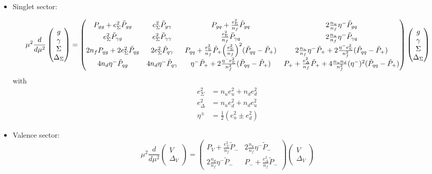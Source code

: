 \documentclass[a4paper,twoside]{article}
\title{}
\author{}
\date{}
\begin{document}
\maketitle
\begin{itemize}
\item Singlet sector:

\begin{equation*}
\mu^2\frac{d}{d\mu^2}
\begin{pmatrix}
g \\
\gamma \\
\Sigma \\
\Delta_\Sigma
\end{pmatrix}
=
\begin{pmatrix}
 P_{gg}+e_\Sigma^2 \tilde{P}_{gg} & e_\Sigma^2 \tilde{P}_{g\gamma} & P_{gq} + \frac{e_\Sigma^2}{n_f}\tilde{P}_{gq} & 2\frac{n_u}{n_f}\eta^- \tilde{P}_{gq} \\
 e_\Sigma^2 \tilde{P}_{\gamma g} & e_\Sigma^2 \tilde{P}_{\gamma \gamma} & \frac{e_\Sigma^2}{n_f}\tilde{P}_{\gamma q} & 2\frac{n_u}{n_f}\eta^- \tilde{P}_{\gamma q} \\
 2n_f P_{qg} +2e_\Sigma^2  \tilde{P}_{qg} & 2 e_\Sigma^2  \tilde{P}_{q\gamma} & P_{qq}+ \frac{e_\Sigma^2}{n_f}\tilde{P}_{+}  \Bigl(\frac{e_\Sigma^2}{n_f}\Bigr)^2(\tilde{P}_{qq}-\tilde{P}_{+}) & 2\frac{n_u}{n_f}\eta^-\tilde{P}_{+}+2\frac{\eta^-e_\Sigma^2}{n_f^2}(\tilde{P}_{qq}-\tilde{P}_{+}) \\
 4n_d\eta^-\tilde{P}_{qg} & 4n_d\eta^-\tilde{P}_{q\gamma} & \eta^- \tilde{P}_{+} +2\frac{\eta^-e_\Sigma^2}{n_f^2}(\tilde{P}_{qq}-\tilde{P}_{+}) & P_+ +\frac{e_\Delta^2}{n_f}\tilde{P}_{+} +4\frac{n_u n_d}{n_f^2}(\eta^-)^2(\tilde{P}_{qq}-\tilde{P}_{+})
\end{pmatrix}
\begin{pmatrix}
g \\
\gamma \\
\Sigma \\
\Delta_\Sigma
\end{pmatrix}
\end{equation*}
with
\begin{align*}
e_\Sigma^2&=n_u e_u^2+n_d e_d^2 \\
e_\Delta^2&=n_u e_d^2+n_d e_u^2 \\
\eta^\pm &= \frac{1}{2}(e_u^2 \pm e_d^2)
\end{align*}

\item Valence sector:
\begin{equation*}
\mu^2\frac{d}{d\mu^2}
\begin{pmatrix}
V \\
\Delta_V
\end{pmatrix}
=
\begin{pmatrix}
P_V+\frac{e_\Sigma^2}{n_f} \tilde{P}_{-} & 2\frac{n_u}{n_f}\eta^- \tilde{P}_{-}\\
 2\frac{n_d}{n_f}\eta^- \tilde{P}_{-}& P_-+\frac{e_\Delta^2}{n_f} \tilde{P}_{-}
\end{pmatrix}
\begin{pmatrix}
V \\
\Delta_V
\end{pmatrix}
\end{equation*}


\end{itemize}
\end{document}
